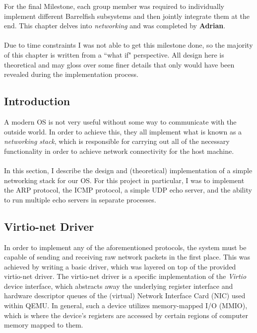 For the final Milestone, each group member was required to individually implement different Barrelfish subsystems and then jointly integrate them at the end. This chapter delves into \textit{networking} and was completed by \textbf{Adrian}.
\\\\
Due to time constraints I was not able to get this milestone done, so the majority of this chapter is written from a ``what if" perspective. All design here is theoretical and may gloss over some finer details that only would have been revealed during the implementation process.

\subsection{Introduction}
A modern OS is not very useful without some way to communicate with the outside world. In order to achieve this, they all implement what is known as a \textit{networking stack}, which is responsible for carrying out all of the necessary functionality in order to achieve network connectivity for the host machine.
\\\\
In this section, I describe the design and (theoretical) implementation of a simple networking stack for our OS. For this project in particular, I was to implement the ARP protocol, the ICMP protocol, a simple UDP echo server, and the ability to run multiple echo servers in separate processes.

\subsection{Virtio-net Driver}
In order to implement any of the aforementioned protocols, the system must be capable of sending and receiving raw network packets in the first place. This was achieved by writing a basic driver, which was layered on top of the provided virtio-net driver. The virtio-net driver is a specific implementation of the \textit{Virtio} device interface, which abstracts away the underlying register interface and hardware descriptor queues of the (virtual) Network Interface Card (NIC) used within QEMU. In general, such a device utilizes memory-mapped I/O (MMIO), which is where the device's registers are accessed by certain regions of computer memory mapped to them.

